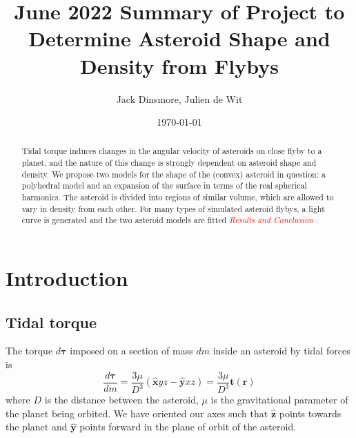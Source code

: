 \documentclass[aps,twocolumn,secnumarabic,balancelastpage,amsmath,amssymb,nofootinbib,floatfix]{revtex4-1}
\begin{document}
\title{June 2022 Summary of Project to Determine Asteroid Shape and Density from Flybys}
\author{Jack Dinsmore, Julien de Wit}
\date{\today}

\newcommand{\abs}[1]{\left| #1 \right|}
\newcommand{\parens}[1]{\left( #1 \right)}
\newcommand{\brackets}[1]{\left[ #1 \right]}
\newcommand{\comment}[1]{\textcolor{red}{\emph{ #1 }}}






\begin{abstract}
    Tidal torque induces changes in the angular velocity of asteroids on close flyby to a planet, and the nature of this change is strongly dependent on asteroid shape and density. We propose two models for the shape of the (convex) asteroid in question: a polyhedral model and an expansion of the surface in terms of the real spherical harmonics. The asteroid is divided into regions of similar volume, which are allowed to vary in density from each other. For many types of simulated asteroid flybys, a light curve is generated and the two asteroid models are fitted \comment{Results and Conclusion}.
\end{abstract}

\maketitle



\section{Introduction}
\subsection{Tidal torque}
The torque $d\bm{\tau}$ imposed on a section of mass $dm$ inside an asteroid by tidal forces is
\begin{equation}
    \frac{d\bm{\tau}}{dm} =\frac{3\mu}{D^3} (\bm{\hat x} yz - \bm{\hat y} xz) = \frac{3\mu}{D^3} \bm{t}(\bm{r})
    \label{eqn:diff-torque}
\end{equation}
where $D$ is the distance between the asteroid, $\mu$ is the gravitational parameter of the planet being orbited. We have oriented our axes such that $\hat {\bm z}$ points towards the planet and $\hat {\bm y}$ points forward in the plane of orbit of the asteroid.
\end{document}
